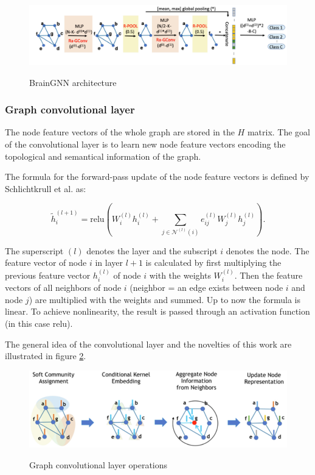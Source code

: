\begin{figure}[ht]
	\centering
	\includegraphics[width=1.0\linewidth]{figures/architecture.png}
	\caption{BrainGNN architecture}
	\cite{LI2021102233}
	\label{fig:architecture}
\end{figure}

\subsubsection{Graph convolutional layer}
\label{approach:Ba}

The node feature vectors of the whole graph are stored in the $H$ matrix. The goal of the convolutional layer is to learn new node feature vectors encoding the topological and semantical information of the graph.

The formula for the forward-pass update of the node feature vectors is defined by Schlichtkrull et al. \cite{10.1007/978-3-319-93417-4_38} as:

\begin{equation}\label{eq:conv_general}
\tilde{h}_i^{(l+1)} = \textrm{relu} \left( W_i^{(l)} h_i^{(l)} + \sum_{j \in \mathcal{N}^{(l)}(i)}^{} e_{ij}^{(l)} W_j^{(l)} h_j^{(l)} \right).
\end{equation}

The superscript $(l)$ denotes the layer and the subscript $i$ denotes the node.
The feature vector of node $i$ in layer $l+1$ is calculated by first multiplying the previous feature vector $h_i^{(l)}$ of node $i$ with the weights $W_i^{(l)}$. Then the feature vectors of all neighbors of node $i$ (neighbor = an edge exists between node $i$ and node $j$) are multiplied with the weights and summed. Up to now the formula is linear. To achieve nonlinearity, the result is passed through an activation function (in this case relu).


The general idea of the convolutional layer and the novelties of this work are illustrated in figure \ref{fig:convolution}.
\begin{figure}[ht]
	\centering
	\includegraphics[width=1.0\linewidth]{figures/convolution.png}
	\caption{Graph convolutional layer operations}
	\cite{LI2021102233}
	\label{fig:convolution}
\end{figure}

